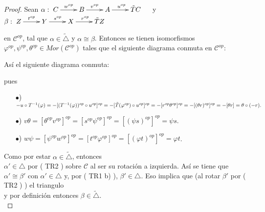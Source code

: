 \documentclass{article}
\begin{document}
\begin{enumerate}
\begin{proof}
 Sean $\alpha:\xymatrix{C\ar[r]^{w^{op}}&B\ar[r]^{v^{op}}&A\ar[r]^{u^{op}}&\tilde{T}C}\quad $ y \\
$\beta:\xymatrix{Z\ar[r]^{t^{op}}&Y\ar[r]^{s^{op}}&X\ar[r]^{r^{op}}&\tilde{T}Z}$

en $\mathscr{C}^{op}$, tal que $\alpha\in \tilde{\triangle}$ y $\alpha\cong \beta$. Entonces se tienen isomorfismos \\
$\varphi^{op}, \psi^{op}, \theta^{op}\in Mor(\mathscr{C}^{op})$ tales que el siguiente diagrama conmuta en $\mathscr{C}^{op}$:\\

\centerline{
}
Así el siguiente diagrama conmuta:\\
\centerline{
}

pues \begin{itemize} 
\item[$\bullet$)] $-u\circ T^{-1}(\varphi)=-[( T^{-1}(\varphi))^{op}\circ u^{op}]^{op}=-[\tilde{T}(\varphi^{op})\circ u^{op}]^{op}\\
=-[r^{op}\theta^{op}]^{op}=-[(\theta r)^{op}]^{op}=-[\theta r]=\theta\circ (-r).$
\item[$\bullet$)] $v\theta=[\theta^{op}v^{op}]^{op}=[s^{op}\psi^{op}]^{op}=[( \psi s)^{op}]^{op}=\psi s$.
\item[$\bullet$)] $w\psi=[\psi^{op}w^{op}]^{op}=[t^{op}\varphi^{op}]^{op}=[(\varphi t)^{op}]^{op}=\varphi t$.
\end{itemize}

Como  por estar $\alpha\in \tilde{\triangle}$, entonces \\
$\alpha'\in \triangle$ por ( TR2 ) sobre $\mathscr{C}$ al ser su rotación a izquierda. 
Así se tiene que $\alpha'\cong \beta'$ con $\alpha'\in \triangle$ y, por ( TR1 b) ), $\beta'\in \triangle$.
Eso implica que (al rotar $\beta'$ por ( TR2 ) ) el triangulo  \\y por definición entonces 
$\beta\in\tilde{\triangle}$.\\


\end{proof}
\end{enumerate}
\end{document}

